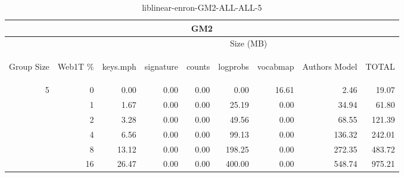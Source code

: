 \begin{center}
\begin{table}[htbp]
\begin{tabular}{ | r | r | r | r | r | r | r | r | r |}
\hline
\multicolumn{9}{|c|}{GM2}\\
\hline
 & & \multicolumn{7}{|c|}{Size (MB)}\\ \cline{3-9}
\begin{sideways}Group Size\end{sideways} & \begin{sideways}Web1T \% \end{sideways} & \begin{sideways}keys.mph\end{sideways} & \begin{sideways}signature\end{sideways} & \begin{sideways}counts\end{sideways} & \begin{sideways}logprobs\end{sideways} & \begin{sideways}vocabmap\end{sideways} & \begin{sideways}Authors Model \end{sideways} & \begin{sideways}TOTAL\end{sideways}\\
\hline
\multirow{5}{*}{5}
 & 0 & 0.00 & 0.00 & 0.00 & 0.00 & 16.61 & 2.46 & 19.07\\ \cline{2-9}
 & 1 & 1.67 & 0.00 & 0.00 & 25.19 & 0.00 & 34.94 & 61.80\\ \cline{2-9}
 & 2 & 3.28 & 0.00 & 0.00 & 49.56 & 0.00 & 68.55 & 121.39\\ \cline{2-9}
 & 4 & 6.56 & 0.00 & 0.00 & 99.13 & 0.00 & 136.32 & 242.01\\ \cline{2-9}
 & 8 & 13.12 & 0.00 & 0.00 & 198.25 & 0.00 & 272.35 & 483.72\\ \cline{2-9}
 & 16 & 26.47 & 0.00 & 0.00 & 400.00 & 0.00 & 548.74 & 975.21\\ \cline{2-9}
\hline
\end{tabular}
\caption{liblinear-enron-GM2-ALL-ALL-5}
\label{table:liblinear-enron-GM2-ALL-ALL-5}
\end{table}
\end{center}

